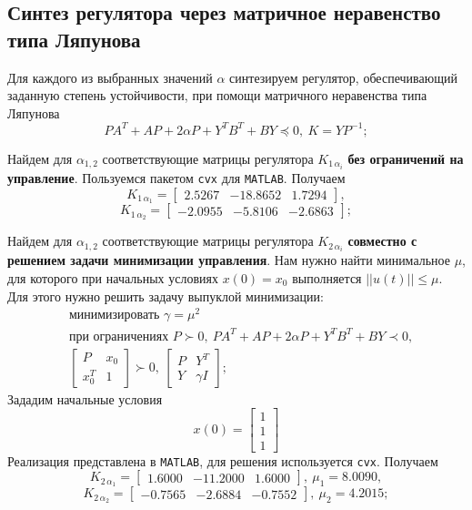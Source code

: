 \documentclass[a4paper, 12pt]{article}
\begin{document}
    \subsection{Синтез регулятора через матричное неравенство типа Ляпунова}
    Для каждого из выбранных значений $\alpha$ синтезируем регулятор, обеспечивающий
    заданную степень устойчивости, при помощи матричного неравенства типа Ляпунова
    $$
    PA^T+AP+2\alpha P+Y^TB^T+BY\preceq0,\ K=YP^{-1};
    $$


    Найдем для $\alpha_{1,2}$ соответствующие матрицы регулятора $K_{1\,\alpha_i}$ \textbf{без ограничений на управление}.
    Пользуемся пакетом \texttt{cvx} для \texttt{MATLAB}. Получаем
    $$
    K_{1\,\alpha_1}=\begin{bmatrix}
        2.5267  &-18.8652    &1.7294
    \end{bmatrix},
    $$
    $$
    K_{1\,\alpha_2}=\begin{bmatrix}
        -2.0955   &-5.8106   &-2.6863
    \end{bmatrix};
    $$


    Найдем для $\alpha_{1,2}$ соответствующие матрицы регулятора $K_{2\,\alpha_i}$ \textbf{совместно с решением задачи минимизации управления}.
    Нам нужно найти минимальное $\mu$, для которого при начальных условиях $x(0)=x_0$
    выполняется $||u(t)||\leq\mu$. Для этого нужно решить задачу выпуклой минимизации:
    \begin{align*}
    &\text{минимизировать }\gamma=\mu^2\\
    &\text{при ограничениях } P\succ0,\ PA^T+AP+2\alpha P+Y^TB^T+BY\prec0,\\
    &\begin{bmatrix}
        P &x_0\\
        x_0^T &1
    \end{bmatrix}\succ0,\ \begin{bmatrix}
        P &Y^T\\
        Y &\gamma I
    \end{bmatrix};
    \end{align*}
    Зададим начальные условия $$x(0)=\begin{bmatrix}
        1 \\1 \\1
    \end{bmatrix}$$
    Реализация представлена в \texttt{MATLAB}, для решения используется \texttt{cvx}. Получаем
    $$
    K_{2\,\alpha_1}=\begin{bmatrix}
        1.6000  &-11.2000    &1.6000
    \end{bmatrix},\ \mu_1=8.0090,
    $$
    $$
    K_{2\,\alpha_2}=\begin{bmatrix}
        -0.7565   &-2.6884   &-0.7552
    \end{bmatrix},\ \mu_2=4.2015;
    $$
\end{document}
